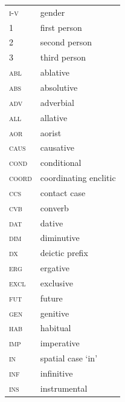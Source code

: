 \documentclass[output=paper,%
colorlinks,citecolor=brown,
showindex
]{langscibook}
\begin{document}
\begin{tabularx}{.45\textwidth}{lQ}
\textsc{i-v} & gender\\
\textsc{1} & first person \\
\textsc{2} & second person \\
\textsc{3} & third person \\
\textsc{abl} & ablative \\
\textsc{abs} & absolutive \\
\textsc{adv} & adverbial \\
\textsc{all} & allative \\
\textsc{aor} & aorist\\
\textsc{caus} & causative\\
\textsc{cond} & conditional \\
\textsc{coord} & coordinating enclitic \\
\textsc{ccs} & contact case\\
\textsc{cvb} & converb\\
\textsc{dat} & dative\\
\textsc{dim} & diminutive\\
\textsc{dx} & deictic prefix\\
\textsc{erg} & ergative\\
\textsc{excl} & exclusive\\
\textsc{fut} & future\\
\textsc{gen} & genitive\\
\textsc{hab} & habitual\\
\textsc{imp} & imperative\\
\textsc{in} & spatial case `in'\\
\textsc{inf} & infinitive\\
\textsc{ins} & instrumental\\
\end{tabularx}
\end{document}
